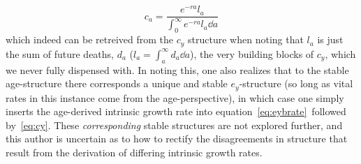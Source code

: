 \begin{equation}
c_a = \frac{e^{-ra}l_a}{\int _0 ^\infty e^{-ra}l_a \dd a}
\end{equation}
which indeed can be retreived from the $c_y$ structure when noting that $l_a$ is
just the sum of future deaths, $d_a$ ($l_a = \int _a ^\infty d_a \dd a$), the
very building blocks of $c_y$, which we never fully dispensed with. In noting
this, one also realizes that to the stable age-structure there corresponds a
unique and stable $e_y$-structure (so long as vital rates in this instance come
from the age-perspective), in which case one simply inserts the age-derived intrinsic
growth rate into equation~\eqref{eq:eybrate}~followed by~\eqref{eq:cy}. These
\textit{corresponding} stable structures are not explored further, and this
author is uncertain as to how to rectify the disagreements in structure that
result from the derivation of differing intrinsic growth rates.

 \FloatBarrier
